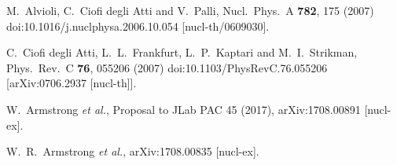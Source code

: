 \documentclass[twocolumn]{revtex4}
\begin{document}
\begin{thebibliography}{25}
  M.~Alvioli, C.~Ciofi degli Atti and V.~Palli,
  Nucl.\ Phys.\ A {\bf 782}, 175 (2007)
  doi:10.1016/j.nuclphysa.2006.10.054
  [nucl-th/0609030].

  C.~Ciofi degli Atti, L.~L.~Frankfurt, L.~P.~Kaptari and M.~I.~Strikman,
  Phys.\ Rev.\ C {\bf 76}, 055206 (2007)
  doi:10.1103/PhysRevC.76.055206
  [arXiv:0706.2937 [nucl-th]].

  W.~Armstrong {\it et al.},
  Proposal to JLab PAC 45 (2017),
  arXiv:1708.00891 [nucl-ex].

  W.~R.~Armstrong {\it et al.},
  arXiv:1708.00835 [nucl-ex].



\end{thebibliography}
\end{document}
